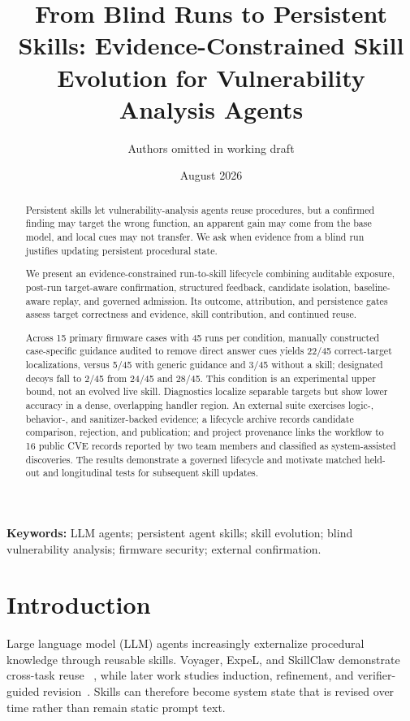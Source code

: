 \documentclass[11pt]{article}
\title{From Blind Runs to Persistent Skills: Evidence-Constrained Skill Evolution for Vulnerability Analysis Agents}
\author{Authors omitted in working draft}
\date{August 2026}
\begin{document}
\maketitle

\begin{abstract}
Persistent skills let vulnerability-analysis agents reuse procedures, but a confirmed
finding may target the wrong function, an apparent gain may come from the base model, and
local cues may not transfer.  We ask when evidence from a blind run justifies updating
persistent procedural state.

We present an evidence-constrained run-to-skill lifecycle combining auditable exposure,
post-run target-aware confirmation, structured feedback, candidate isolation,
baseline-aware replay, and governed admission.  Its outcome, attribution, and persistence
gates assess target correctness and evidence, skill contribution, and continued reuse.

Across 15 primary firmware cases with 45 runs per condition, manually constructed
case-specific guidance audited to remove direct answer cues yields 22/45 correct-target
localizations, versus 5/45 with generic guidance and 3/45 without a skill; designated
decoys fall to 2/45 from 24/45 and 28/45.  This condition is an experimental upper bound,
not an evolved live skill.  Diagnostics localize separable targets but show lower
accuracy in a dense, overlapping handler region.  An external suite exercises logic-, behavior-, and
sanitizer-backed evidence; a lifecycle archive records candidate comparison, rejection,
and publication; and project provenance links the workflow to 16 public CVE records
reported by two team members and classified as system-assisted discoveries.  The results
demonstrate a governed lifecycle and motivate matched held-out and longitudinal tests for
subsequent skill updates.
\end{abstract}

\noindent\textbf{Keywords:} LLM agents; persistent agent skills; skill evolution; blind
vulnerability analysis; firmware security; external confirmation.

\section{Introduction}
\label{sec:intro}

Large language model (LLM) agents increasingly externalize procedural knowledge through
reusable skills.  Voyager, ExpeL, and SkillClaw demonstrate cross-task reuse
~\cite{voyager,expel,skillclaw}, while later work studies induction, refinement, and
verifier-guided revision~\cite{ctx2skill,opid,spark,skillevolbench,trace2skill,veriskill}.
Skills can therefore become system state that is revised over time rather than remain
static prompt text.
\end{document}
